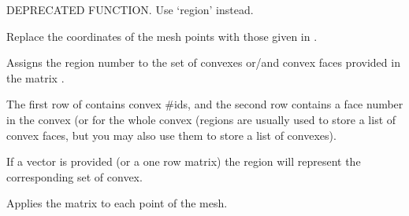 \documentclass[a4paper,11pt,english]{sphinxmanual}
\begin{document}
\begin{fulllineitems}
\begin{fulllineitems}
\label{\detokenize{python/cmdref_Mesh:getfem.Mesh.set_boundary}}
DEPRECATED FUNCTION. Use ‘region’ instead.

\end{fulllineitems}


\begin{fulllineitems}
\label{\detokenize{python/cmdref_Mesh:getfem.Mesh.set_pts}}
Replace the coordinates of the mesh points with those given in .

\end{fulllineitems}


\begin{fulllineitems}
\label{\detokenize{python/cmdref_Mesh:getfem.Mesh.set_region}}
Assigns the region number  to the set of convexes or/and convex
faces provided in the matrix .

The first row of  contains convex \#ids, and the second row
contains a face number in the convex (or 
for the whole convex (regions are usually used to store a list of
convex faces, but you may also use them to store a list of convexes).

If a vector is provided (or a one row matrix) the region will represent
the corresponding set of convex.

\end{fulllineitems}


\begin{fulllineitems}
\label{\detokenize{python/cmdref_Mesh:getfem.Mesh.transform}}
Applies the matrix  to each point of the mesh.


\end{fulllineitems}
\end{fulllineitems}
\end{document}
